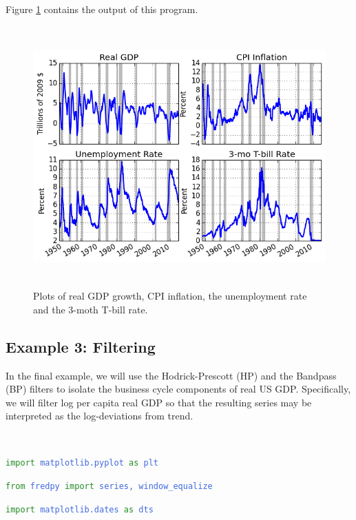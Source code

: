 \documentclass[11pt,fleqn]{article}
\newcommand{\ttt}{\texttt}
\newcommand{\tc}{\textcolor}
\begin{document}
\noindent Figure \ref{fig:2} contains the output of this program.

\begin{figure}[h] \caption{\label{fig:2} Plots of real GDP growth, CPI inflation, the unemployment rate and the 3-moth T-bill rate.}
\begin{center}
\includegraphics[height = 10cm]{fig_fredpy_example2.png}
\end{center}
\end{figure}


\subsection{Example 3: Filtering}

In the final example, we will use the Hodrick-Prescott (HP) and the Bandpass (BP) filters to isolate the business cycle components of real US GDP. Specifically, we will filter log per capita real GDP so that the resulting series may be interpreted as the log-deviations from trend.

\

\begin{minipage}{6.5in}
\ttt{\tc{ForestGreen}{import} \tc{RoyalBlue}{matplotlib.pyplot} \tc{ForestGreen}{as} \tc{RoyalBlue}{plt}}

\ttt{\tc{ForestGreen}{from} \tc{RoyalBlue}{fredpy} \tc{ForestGreen}{import} \tc{RoyalBlue}{series, window\_equalize}}

\ttt{\tc{ForestGreen}{import} \tc{RoyalBlue}{matplotlib.dates} \tc{ForestGreen}{as} \tc{RoyalBlue}{dts}}

\

\end{minipage}
\end{document}

